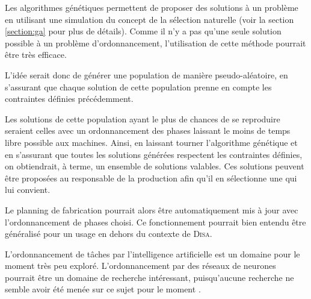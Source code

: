 Les algorithmes génétiques permettent de proposer des solutions à un problème en utilisant une simulation du concept de la sélection naturelle (voir la section \ref{section:ga} pour plus de détails).
Comme il n'y a pas qu'une seule solution possible à un problème d'ordonnancement, l'utilisation de cette méthode pourrait être très efficace.

L'idée serait donc de générer une population de manière pseudo-aléatoire, en s'assurant que chaque solution de cette population prenne en compte les contraintes définies précédemment.

Les solutions de cette population ayant le plus de chances de se reproduire seraient celles avec un ordonnancement des phases laissant le moins de temps libre possible aux machines.
Ainsi, en laissant tourner l'algorithme génétique et en s'assurant que toutes les solutions générées respectent les contraintes définies, on obtiendrait, à terme, un ensemble de solutions valables.
Ces solutions peuvent être proposées au responsable de la production afin qu'il en sélectionne une qui lui convient.

Le planning de fabrication pourrait alors être automatiquement mis à jour avec l'ordonnancement de phases choisi.
Ce fonctionnement pourrait bien entendu être généralisé pour un usage en dehors du contexte de \textsc{Disa}.

L'ordonnancement de tâches par l'intelligence artificielle est un domaine pour le moment très peu exploré.
L'ordonnancement par des réseaux de neurones pourrait être un domaine de recherche intéressant, puisqu'aucune recherche ne semble avoir été menée sur ce sujet pour le moment \cite{ordo}.